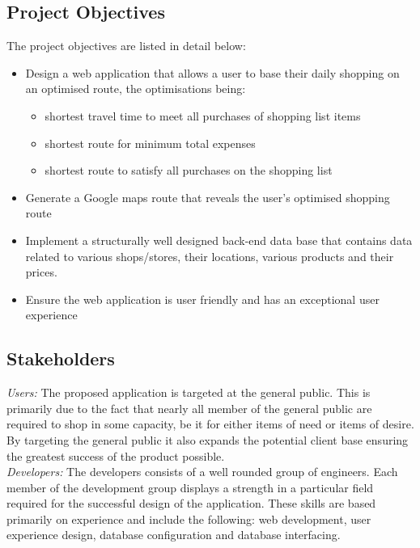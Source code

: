 \documentclass[10pt,twocolumn]{witseiepaper}
\begin{document}
	\subsection{Project Objectives}

		The project objectives are listed in detail below:

		\begin{itemize}
			\item Design a web application that allows a user to base their daily shopping on an optimised route, the optimisations being:
			\begin{itemize}
				\item shortest travel time to meet all purchases of shopping list items 
				\item shortest route for minimum total expenses
				\item shortest route to satisfy all purchases on the shopping list 
			\end{itemize}
			\item Generate a Google maps route that reveals the user's optimised shopping route
			\item Implement a structurally well designed back-end data base that contains data related to various shops/stores, their locations, various products and their prices.
			\item Ensure the web application is user friendly and has an exceptional user experience
		\end{itemize}

	\subsection{Stakeholders}
		
		\textit{Users:} The proposed application is targeted at the general public. This is primarily due to the fact that nearly all member of the general public are required to shop in some capacity, be it for either items of need or items of desire. By targeting the general public it also expands the potential client base ensuring the greatest success of the product possible.\\
		
		\textit{Developers:} The developers consists of a well rounded group of engineers. Each member of the development group displays a strength in a particular field required for the successful design of the application. These skills are based primarily on experience and include the following: web development, user experience design, database configuration and database interfacing.\\ 
		
\end{document}

